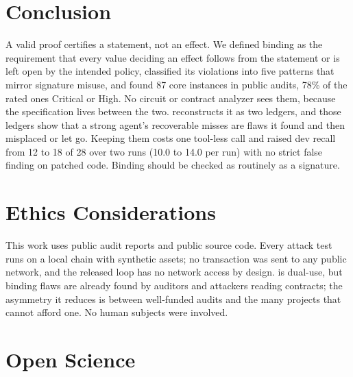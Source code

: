 \section{Conclusion}\label{sec:conclusion}

A valid proof certifies a statement, not an effect. We defined binding as the
requirement that every value deciding an effect follows from the statement or
is left open by the intended policy, classified its violations into five
patterns that mirror signature misuse, and found 87 core instances in public
audits, 78\% of the rated ones Critical or High. No circuit or contract
analyzer sees them, because the specification lives between the two.
\tool{} reconstructs it as two ledgers, and those ledgers show that a strong
agent's recoverable misses are flaws it found and then misplaced or let go.
Keeping them costs one tool-less call and raised dev recall from 12 to 18 of
28 over two runs (10.0 to 14.0 per run) with no strict false finding on
patched code.  Binding should be checked as
routinely as a signature.

\section*{Ethics Considerations}
This work uses public audit reports and public source code. Every attack test
runs on a local chain with synthetic assets; no transaction was sent to any
public network, and the released loop has no network access by design.
\tool{} is dual-use, but binding flaws are already found by auditors and
attackers reading contracts; the asymmetry it reduces is between well-funded
audits and the many projects that cannot afford one.  No human
subjects were involved.

\section*{Open Science}
